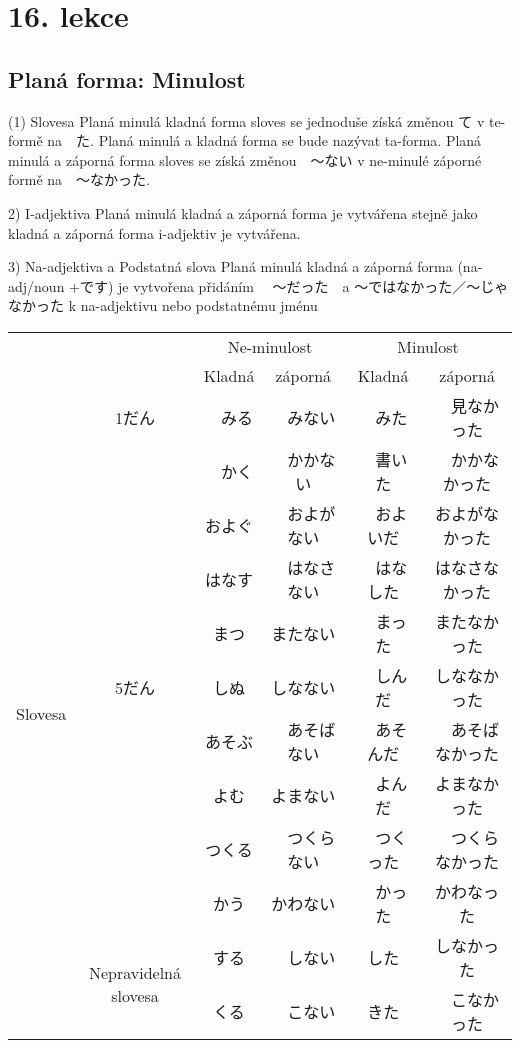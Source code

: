 \section{16. lekce}
\label{sec:lekce_16}

\subsection{Planá forma: Minulost}
(1) Slovesa
Planá minulá kladná forma sloves se jednoduše získá změnou て v te-formě na　た. Planá minulá a kladná forma se bude nazývat ta-forma. Planá minulá a záporná forma sloves se získá změnou　〜ない v ne-minulé záporné formě na　〜なかった.

2) I-adjektiva
Planá minulá kladná  a záporná forma je vytvářena stejně jako kladná a záporná forma i-adjektiv je vytvářena.

3) Na-adjektiva a Podstatná slova
Planá minulá kladná a záporná  forma (na-adj/noun +です) je vytvořena přidáním 　〜だった　a 〜ではなかった／〜じゃなかった k na-adjektivu nebo podstatnému jménu

\begin{center}
\begin{tabular}{cccccc}
\hline
&&\multicolumn{2}{c}{Ne-minulost}&\multicolumn{2}{c}{Minulost}\\
&&Kladná & záporná & Kladná&záporná\\
\hline
\multirow{ 12}{*}{Slovesa}&1だん&　みる&　みない&　みた&　見なかった\\
&\multirow{9}{*}{5だん}&　かく&　かかない&　書いた&　かかなかった\\
&&	およぐ&　およがない&　およいだ　&およがなかった\\
&&	はなす&　はなさない&　はなした　&はなさなかった\\
&&	まつ　&またない&　まった　&またなかった\\
&&	しぬ　&しなない&　しんだ　&しななかった\\
&&	あそぶ&　あそばない&　あそんだ&　あそばなかった\\
&&	よむ　&よまない&　よんだ　&よまなかった\\
&&	つくる&　つくらない&　つくった&　つくらなかった\\
&&	かう　&かわない&　かった　&かわなった\\
&\multirow{2}{*}{Nepravidelná slovesa}	&する&　しない　&した　&しなかった\\
	&&くる&　こない　&きた&　こなかった\\
\hline
\end{tabular}
\end{center}
	

